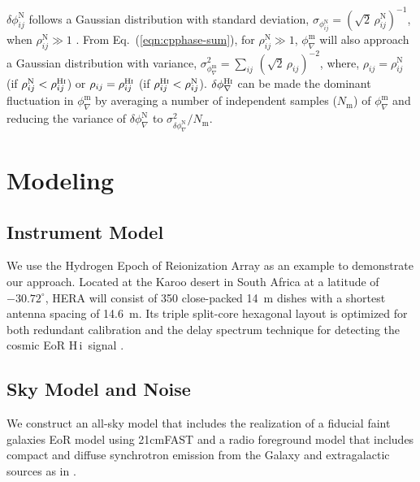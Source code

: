 \documentclass[
reprint,
superscriptaddress,
amsmath,
amssymb,
aps,
prd
]{revtex4-1}
\newcommand{\HI}{H\,{\sc i}}
\begin{document}
$\delta\phi_{ij}^\textrm{N}$ follows a Gaussian distribution with standard deviation, $\sigma_{\phi_{ij}^\textrm{N}} = (\sqrt{2}\,\rho_{ij}^\textrm{N})^{-1}$, when $\rho_{ij}^\textrm{N}\gg 1$ \cite{cra89}. From Eq.~(\ref{eqn:cpphase-sum}), for $\rho_{ij}^\textrm{N}\gg 1$, $\phi_\nabla^\textrm{m}$ will also approach a Gaussian distribution with variance, $\sigma_{\phi_\nabla^\textrm{m}}^2 = \sum_{ij}\,(\sqrt{2}\,\rho_{ij})^{-2}$, where, $\rho_{ij}=\rho_{ij}^\textrm{N}$ (if $\rho_{ij}^\textrm{N} < \rho_{ij}^\textrm{H{\sc i}}$) or $\rho_{ij}=\rho_{ij}^\textrm{H{\sc i}}$ (if $\rho_{ij}^\textrm{H{\sc i}} < \rho_{ij}^\textrm{N}$). $\delta\phi_\nabla^\textrm{H{\sc i}}$ can be made the dominant fluctuation in $\phi_\nabla^\textrm{m}$ by averaging a number of independent samples ($N_\textrm{m}$) of $\phi_\nabla^\textrm{m}$ and reducing the variance of $\delta\phi_\nabla^\textrm{N}$ to $\sigma_{\delta\phi_\nabla^\textrm{N}}^2 / N_\textrm{m}$. 

\section{Modeling}\label{sec:modeling}

\subsection{Instrument Model}\label{sec:instrument}

We use the Hydrogen Epoch of Reionization Array \cite[HERA;][]{deb17,thy16,ewa16,neb16,patra17} as an example to demonstrate our approach. Located at the Karoo desert in South Africa at a latitude of $-30.72^\circ$, HERA will consist of 350 close-packed 14~m dishes with a shortest antenna spacing of 14.6~m. Its triple split-core hexagonal layout is optimized for both redundant calibration and the delay spectrum technique for detecting the cosmic EoR \HI\ signal \cite{dil16}. 

\subsection{Sky Model and Noise}\label{sec:skymodel-noise}

We construct an all-sky model that includes the realization of a fiducial {\sc faint galaxies} EoR model \cite{gre17b} using 21cmFAST \cite{mes11} and a radio foreground model that includes compact and diffuse synchrotron emission from the Galaxy and extragalactic sources as in \cite{thy15a}. 
\end{document}
